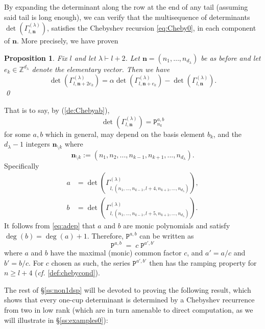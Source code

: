 \documentclass{article}
\newcommand{\ppm}[1]{\textcolor{red}{#1}}
\newcommand{\bajm}[1]{\textcolor{blue}{#1}}
\newtheorem{proposition}[theorem]{Proposition}
\theoremstyle{definition}
\newcommand{\beq}{\begin{equation}}
\newcommand{\eq}{\end{equation}}
\newcommand{\PP}{{\mathtt P}}  %
\def\a{\alpha}
\def\l{\lambda}
\def\Z{\mathbb{Z}}
\numberwithin{equation}{subsection}
\begin{document}
By expanding the determinant along the row at the end of any tail (assuming said tail is long enough), we can verify that the multisequence of determinants $\det(\Gamma_{l,\bm{n}}^{(\l)})$, satisfies the Chebyshev recursion \eqref{eq:Cheby0}, in each component of $\bm{n}$. More precisely, we have proven 

\begin{proposition} \label{prop:detrec} Fix $l$ and let $\lambda\vdash l+2$.
Let $\bm{n}=(n_1,\dots,n_{d_\l})$ be as before and let $e_k\in \Z^{d_{\l}}$ denote the elementary vector. Then we have
\beq
\det(\Gamma_{l,\bm{n}+2e_k}^{(\l)})=\a \det(\Gamma_{l,\bm{n}+e_k}^{(\l)})-\det(\Gamma_{l,\bm{n}}^{(\l)}).
\label{eq:detrec2}
\eq 
\qed\end{proposition}

That is to say, by (\ref{de:Chebyab}), 
\beq   \label{eq:detGamP}
\det(\Gamma_{l,\bm{n}}^{(\l)})=  \PP^{a,b}_{n_k} 
\eq 
for some $a,b$ 
which in general, may depend on the basis element $b_k$, and the $d_\l-1$ integers $\bm{n}_{\setminus k}$ where 
\beq  \label{eq:de-nminusk} 
\bm{n}_{\setminus k} := (n_1,n_2,...,n_{k-1},n_{k+1},...,n_{d_\lambda}).
\eq
Specifically 
\begin{align*}
a &= \det\left(\Gamma_{l,(n_1,...,n_{k-1},l+4,n_{k+1},...,n_{d_\lambda})}^{(\l)}\right),\\
b &= \det\left(\Gamma_{l,(n_1,...,n_{k-1},l+5,n_{k+1},...,n_{d_\lambda})}^{(\l)}\right).\end{align*}
It follows from \eqref{eq:adep} that $a$ and $b$ are monic polynomials and satisfy $\deg(b)=\deg(a)+1$. Therefore, $\PP^{a,b}$ can be written as 
\beq  \label{eq:PcP}
\PP^{a,b}
\; = \;  c \; \PP^{a',b'} 
\eq 
where $a$ and $b$ have the maximal (monic) common factor $c$, and $a'=a/c$ and $b'=b/c$. For $c$ chosen as such, the series $\PP^{a',b'}$ then has the ramping property for $n\geq l+4$ (\textit{cf.} \ref{def:chebycond}).



\medskip \medskip 

The rest of \S\ref{ss:non1dsp} will be devoted to proving the following result, 
which shows that every one-cup determinant is determined by a Chebyshev recurrence from two in low rank (which are in turn amenable to direct computation, as we will illustrate in \S\ref{ss:examples0}):
\end{document}
